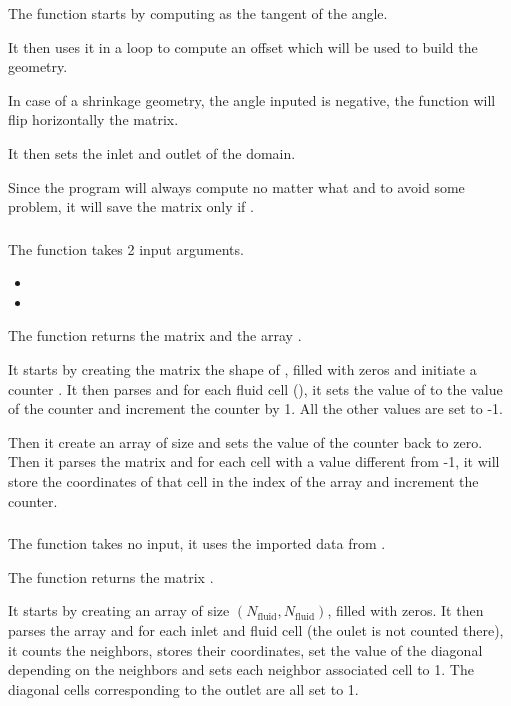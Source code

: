 The function starts by computing  as the tangent of the angle.

It then uses it in a  loop to compute an offset which will be used to
build the geometry.

In case of a shrinkage geometry, the angle inputed is negative, the function
will flip horizontally the matrix.

It then sets the inlet and outlet of the domain.

Since the program will always compute  no matter what and to avoid some
problem, it will save the matrix only if .

\subsubsection{\textcolor{func}{}}
The function \textcolor{func}{} takes 2 input
arguments.
\begin{itemize}
      \item {}
      \item {} 
\end{itemize}
The function returns the matrix  and the array .

It starts by creating the matrix  the shape of , filled with zeros
and initiate a counter . It then parses  and for each fluid
cell (), it sets the value of  to the value of the
counter and increment the counter by 1. All the other values are set to -1.

Then it create an array  of size  and
sets the value of the counter back to zero. Then it parses the matrix 
and for each cell with a value different from -1, it will store the coordinates
of that cell in the index  of the array  and
increment the counter.

\subsubsection{\textcolor{func}{}}
The function \textcolor{func}{} takes no input, it uses the imported data from
.

The function returns the matrix .

It starts by creating an array  of size
$(N_{\text{fluid}}, N_{\text{fluid}})$, filled with zeros. It then
parses the array  and for each inlet and fluid cell (the oulet
is not counted there), it counts the neighbors, stores their coordinates,
set the value of the diagonal depending on the neighbors and sets each
neighbor associated cell to 1. The diagonal cells corresponding to the outlet
are all set to 1.

